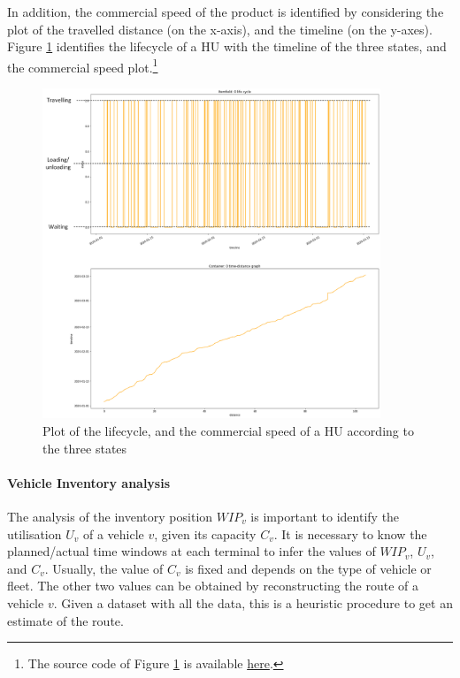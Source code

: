 In addition, the commercial speed of the product is identified by considering the plot of the travelled distance (on the x-axis), and the timeline (on the y-axes). Figure \ref{fig_lifecycle} identifies the lifecycle of a HU with the timeline of the three states, and the commercial speed plot.\footnote{The source code of Figure \ref{fig_lifecycle} is available \href{https://github.com/aletuf93/logproj/blob/master/examples/DIST_01\%20Supply\%20Chain\%20Assessment.ipynb}{here}.}

\begin{figure}[hbt!]
\centering
\includegraphics[width=0.9\textwidth]{SectionDistribution/control_figures/fig_lifecycle.png}
\captionsetup{type=figure}
\caption{Plot of the lifecycle, and the commercial speed of a HU according to the three states}
\label{fig_lifecycle}
\end{figure}

\paragraph{Vehicle Inventory analysis} \label{parVehicleInventoryAnalysis}

The analysis of the inventory position $WIP_v$ is important to identify the utilisation $U_v$ of a vehicle $v$, given its capacity $C_v$. It is necessary to know the planned/actual time windows at each terminal to infer the values of $WIP_v$, $U_v$, and $C_v$. Usually, the value of $C_v$ is fixed and depends on the type of vehicle or fleet. The other two values can be obtained by reconstructing the route of a vehicle $v$. Given a dataset with all the data, this is a heuristic procedure to get an estimate of the route.

